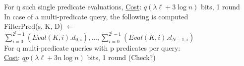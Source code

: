 For q such single predicate evaluations, \underline{Cost}: $q(\lambda \ell + 3 \log n)$ bits, 1 round \\

In case of a multi-predicate query, the following is computed \\

FilterPred(s, K, D) $\leftarrow$ $\sum_{i = 0}^{2^l-1}(Eval(K, i).d_{0, i}), ... , \sum_{i = 0}^{2^l-1}(Eval(K, i).d_{N-1, i})$ \\

For q multi-predicate queries with p predicates per query:\\

\underline{Cost}: $qp(\lambda \ell + 3n \log n)$ bits, 1 round (Check?)




%
